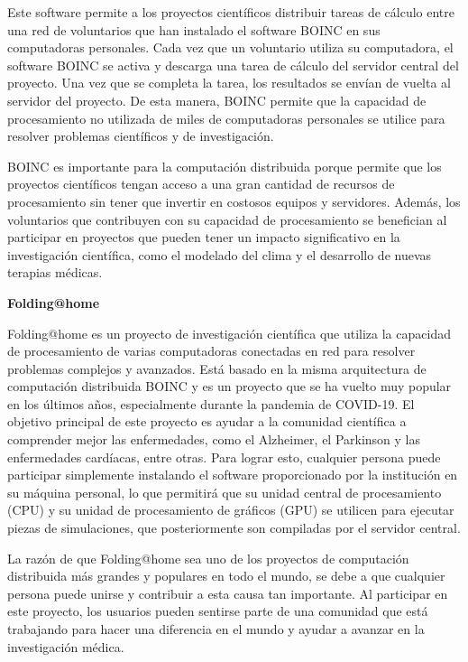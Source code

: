 \begin{spacing}{1.5}
  Este software permite a los proyectos científicos distribuir tareas de
  cálculo entre una red de voluntarios que han instalado el software BOINC en sus
  computadoras personales. Cada vez que un voluntario utiliza su computadora, el
  software BOINC se activa y descarga una tarea de cálculo del servidor central
  del proyecto. Una vez que se completa la tarea, los resultados se envían de
  vuelta al servidor del proyecto. De esta manera, BOINC permite que la capacidad
  de procesamiento no utilizada de miles de computadoras personales se utilice
  para resolver problemas científicos y de investigación.

  BOINC es importante para la computación distribuida porque permite que los
  proyectos científicos tengan acceso a una gran cantidad de recursos de
  procesamiento sin tener que invertir en costosos equipos y servidores. Además,
  los voluntarios que contribuyen con su capacidad de procesamiento se benefician
  al participar en proyectos que pueden tener un impacto significativo en la
  investigación científica, como el modelado del clima y el desarrollo de nuevas
  terapias médicas. \cite{BOINC-1}

  \textbf{Folding@home}

  Folding@home es un proyecto de investigación científica que utiliza la
  capacidad de procesamiento de varias computadoras conectadas en red para
  resolver problemas complejos y avanzados. Está basado en la misma arquitectura
  de computación distribuida BOINC y es un proyecto que se ha vuelto muy popular
  en los últimos años, especialmente durante la pandemia de COVID-19. El objetivo
  principal de este proyecto es ayudar a la comunidad científica a comprender
  mejor las enfermedades, como el Alzheimer, el Parkinson y las enfermedades
  cardíacas, entre otras. Para lograr esto, cualquier persona puede participar
  simplemente instalando el software proporcionado por la institución en su
  máquina personal, lo que permitirá que su unidad central de procesamiento (CPU)
  y su unidad de procesamiento de gráficos (GPU) se utilicen para ejecutar piezas
  de simulaciones, que posteriormente son compiladas por el servidor central.

  La razón de que Folding@home sea uno de los proyectos de computación
  distribuida más grandes y populares en todo el mundo, se debe a que cualquier
  persona puede unirse y contribuir a esta causa tan importante. Al participar en
  este proyecto, los usuarios pueden sentirse parte de una comunidad que está
  trabajando para hacer una diferencia en el mundo y ayudar a avanzar en la
  investigación médica.


\end{spacing}
